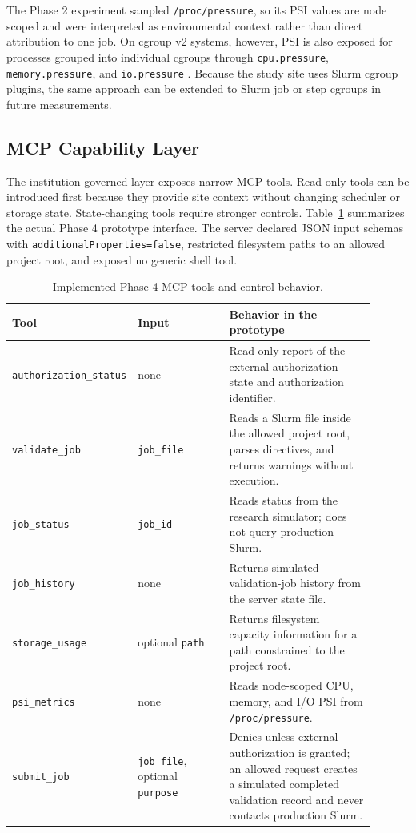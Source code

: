 \documentclass[11pt]{article}
\begin{document}
The Phase 2 experiment sampled \texttt{/proc/pressure}, so its PSI values are node scoped and were interpreted as environmental context rather than direct attribution to one job. On cgroup v2 systems, however, PSI is also exposed for processes grouped into individual cgroups through \texttt{cpu.pressure}, \texttt{memory.pressure}, and \texttt{io.pressure} \cite{linuxcgroupv2}. Because the study site uses Slurm cgroup plugins, the same approach can be extended to Slurm job or step cgroups in future measurements.

\subsection{MCP Capability Layer}

The institution-governed layer exposes narrow MCP tools. Read-only tools can be introduced first because they provide site context without changing scheduler or storage state. State-changing tools require stronger controls. Table~\ref{tab:mcp-tools} summarizes the actual Phase 4 prototype interface. The server declared JSON input schemas with \texttt{additionalProperties=false}, restricted filesystem paths to an allowed project root, and exposed no generic shell tool.

\begin{table}[H]
\centering
\caption{Implemented Phase 4 MCP tools and control behavior.}
\label{tab:mcp-tools}
\small
\begin{tabular}{p{0.20\linewidth}p{0.27\linewidth}p{0.43\linewidth}}
\toprule
\textbf{Tool} & \textbf{Input} & \textbf{Behavior in the prototype} \\
\midrule
\texttt{authorization\_status} & none & Read-only report of the external authorization state and authorization identifier. \\
\texttt{validate\_job} & \texttt{job\_file} & Reads a Slurm file inside the allowed project root, parses directives, and returns warnings without execution. \\
\texttt{job\_status} & \texttt{job\_id} & Reads status from the research simulator; does not query production Slurm. \\
\texttt{job\_history} & none & Returns simulated validation-job history from the server state file. \\
\texttt{storage\_usage} & optional \texttt{path} & Returns filesystem capacity information for a path constrained to the project root. \\
\texttt{psi\_metrics} & none & Reads node-scoped CPU, memory, and I/O PSI from \texttt{/proc/pressure}. \\
\texttt{submit\_job} & \texttt{job\_file}, optional \texttt{purpose} & Denies unless external authorization is granted; an allowed request creates a simulated completed validation record and never contacts production Slurm. \\
\bottomrule
\end{tabular}
\end{table}
\end{document}
